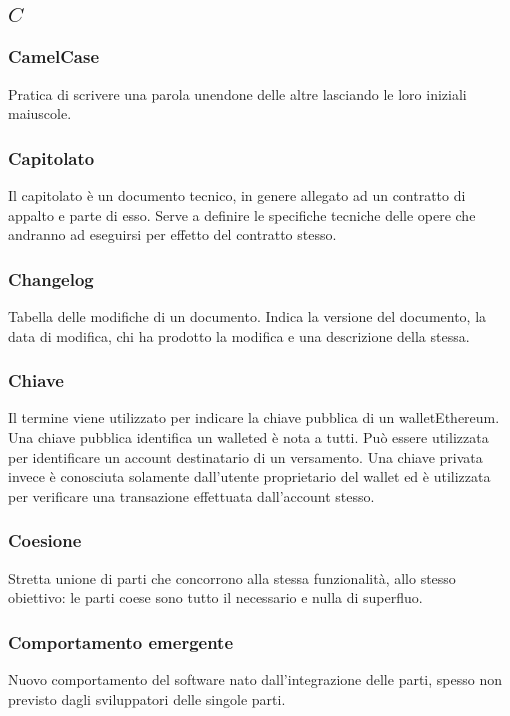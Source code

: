 \subsection*{\quad$C\quad$}
\subsubsection*{CamelCase}
Pratica di scrivere una parola unendone delle altre lasciando le loro iniziali maiuscole.

\subsubsection*{Capitolato}
Il capitolato è un documento tecnico, in genere allegato ad un contratto di appalto e parte di esso. Serve a definire le specifiche tecniche delle opere che andranno ad eseguirsi per effetto del contratto stesso.

\subsubsection*{Changelog}
Tabella delle modifiche di un documento. Indica la versione del documento, la data di modifica, chi ha prodotto
la modifica e una descrizione della stessa.

\subsubsection*{Chiave}
Il termine viene utilizzato per indicare la chiave pubblica di un wallet\glosp Ethereum\glosp. Una chiave pubblica identifica un wallet\glosp ed è nota a tutti. Può essere utilizzata per identificare un account destinatario di un versamento. Una chiave privata invece è conosciuta solamente dall'utente proprietario del wallet ed è utilizzata per verificare una transazione effettuata dall'account stesso. 

\subsubsection*{Coesione}
Stretta unione di parti che concorrono alla stessa funzionalità, allo stesso obiettivo: le parti coese sono tutto il necessario e nulla di superfluo.

\subsubsection*{Comportamento emergente}
Nuovo comportamento del software nato dall'integrazione delle parti, spesso non previsto dagli sviluppatori delle singole parti.

